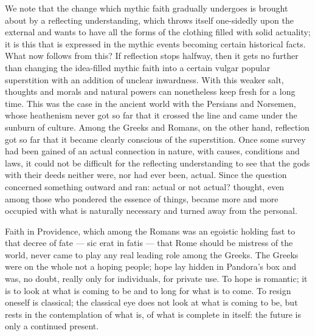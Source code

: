 \documentclass[12pt,a4paper,openany]{book}
\newcommand{\opage}[1]{\marginnote{\footnotesize\textit{[#1]}}}
\begin{document}
We note that the change which mythic faith gradually undergoes is brought about by a
\setcounter{footnote}{0}%
\opage{43}reflecting understanding, which throws itself one-sidedly upon the external and wants
to have all the forms of the clothing filled with solid actuality; it is this that is expressed
in the mythic events becoming certain historical facts. What now follows from this? If
reflection stops halfway, then it gets no further than changing the idea-filled mythic faith
into a certain vulgar popular superstition with an addition of unclear inwardness. With this
weaker salt, thoughts and morals and natural powers can nonetheless keep fresh for a long time.
This was the case in the ancient world with the Persians and Norsemen, whose heathenism never
got so far that it crossed the line and came under the sunburn of culture. Among the Greeks and
Romans, on the other hand, reflection got so far that it became clearly conscious of the
superstition. Once some survey had been gained of an actual connection in nature, with causes,
conditions and laws, it could not be difficult for the reflecting understanding to see that
the gods with their deeds neither were, nor had ever been, actual. Since the question concerned
something outward and ran: actual or not actual? thought, even among those who pondered the
essence of things, became more and more occupied with what is naturally necessary and turned
away from the personal.

Faith in Providence, which among the Romans was an egoistic holding fast to that decree of fate
--- sic erat in fatis --- that Rome should be mistress of the world, never came to play any
real leading role among the Greeks. The Greeks were on the whole not a hoping people; hope lay
hidden in Pandora's box and was, no doubt, really only for individuals, for private use. To
\setcounter{footnote}{0}%
\opage{44}hope is romantic; it is to look at what is coming to be and to long for what is to
come. To resign oneself is classical; the classical eye does not look at what is coming to be,
but rests in the contemplation of what is, of what is complete in itself: the future is only a
continued present.
\end{document}

